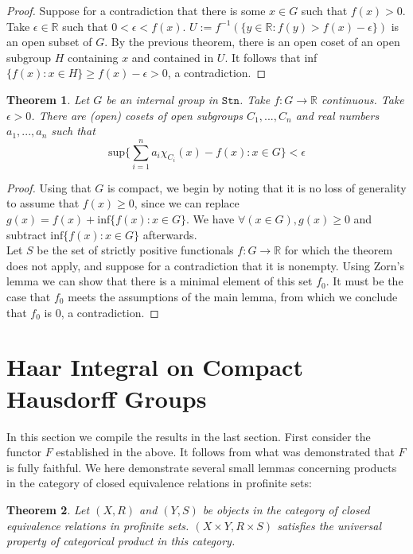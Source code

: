 \documentclass[13pt]{amsart}
\newtheorem{theorem}{Theorem}
\theoremstyle{definition}
\begin{document}
\begin{proof}
Suppose for a contradiction that there is some $x \in G$ such that $f(x) > 0$. Take $\epsilon \in \mathbb{R}$ such that $0 < \epsilon < f(x)$. $U := f^{-1}(\{ y \in \mathbb{R} : f(y) > f(x) - \epsilon \})$ is an open subset of $G$. By the previous theorem, there is an open coset of an open subgroup $H$ containing $x$ and contained in $U$. It follows that inf $\{ f(x) : x \in H \} \geq f(x) - \epsilon > 0 $, a contradiction.
\end{proof}

\begin{theorem}
Let $G$ be an internal group in $\texttt{Stn}$. Take $f : G \rightarrow \mathbb{R}$ continuous. Take $\epsilon > 0$. There are (open) cosets of open subgroups $C_1, ...,C_n$ and real numbers $a_1, ..., a_n$ such that 
\[ \text{sup} \{  \sum_{i = 1}^{n} a_i \chi_{C_i}(x) - f(x) : x \in G \} < \epsilon \]
\end{theorem}

\begin{proof}
Using that $G$ is compact, we begin by noting that it is no loss of generality to assume that $f(x) \geq 0$, since we can replace $g(x) = f(x) + \text{inf} \{ f(x) : x \in G \}$. We have $\forall (x \in G),g(x) \geq 0$ and subtract $\text{inf} \{ f(x) : x \in G \}$ afterwards.\\

Let $S$ be the set of strictly positive functionals $f : G \rightarrow \mathbb{R}$ for which the theorem does not apply, and suppose for a contradiction that it is nonempty. Using Zorn's lemma we can show that there is a minimal element of this set $f_0$. It must be the case that $f_0$ meets the assumptions of the main lemma, from which we conclude that $f_0$ is $0$, a contradiction.
\end{proof}


\section{Haar Integral on Compact Hausdorff Groups}

In this section we compile the results in the last section. First consider the functor $F$ established in the above. It follows from what was demonstrated that $F$ is fully faithful. We here demonstrate several small lemmas concerning products in the category of closed equivalence relations in profinite sets:

\begin{theorem}
Let $(X, R)$ and $(Y, S)$ be objects in the category of closed equivalence relations in profinite sets. $(X \times Y, R \times S)$ satisfies the universal property of categorical product in this category.
\end{theorem}
\end{document}
